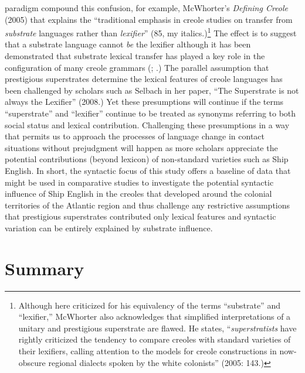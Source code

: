 paradigm compound this confusion, for example, McWhorter’s \textit{Defining Creole} (2005) that explains the “traditional emphasis in creole studies on transfer from \textit{substrate} languages rather than \textit{lexifier}” (85, my italics.)\footnote{Although here criticized for his equivalency of the terms “substrate” and “lexifier,” McWhorter also acknowledges that simplified interpretations of a unitary and prestigious superstrate are flawed. He states, “\textit{superstratists} have rightly criticized the tendency to compare creoles with standard varieties of their lexifiers, calling attention to the models for creole constructions in now-obscure regional dialects spoken by the white colonists” (2005: 143.)}  The effect is to suggest that a substrate language cannot \textit{be} the lexifier although it has been demonstrated that substrate lexical transfer has played a key role in the configuration of many creole grammars (\citealt{Kihm1989}; \citealt{Migge1998}.) The parallel assumption that prestigious superstrates determine the lexical features of creole languages has been challenged by scholars such as Selbach in her paper, “The Superstrate is not always the Lexifier” (2008.) Yet these presumptions will continue if the terms “superstrate” and “lexifier” continue to be treated as synonyms referring to both social status and lexical contribution. Challenging these presumptions in a way that permits us to approach the processes of language change in contact situations without prejudgment will happen as more scholars appreciate the potential contributions (beyond lexicon) of non-standard varieties such as Ship English. In short, the syntactic focus of this study offers a baseline of data that might be used in comparative studies to investigate the potential syntactic influence of Ship English in the creoles that developed around the colonial territories of the Atlantic region and thus challenge any restrictive assumptions that prestigious superstrates contributed only lexical features and syntactic variation can be entirely explained by substrate influence. 

\section{{Summary}}%

